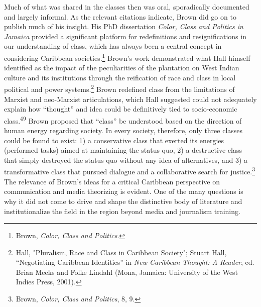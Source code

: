 \documentclass{tufte-handout}
\begin{document}
Much of what was shared in the classes then was oral, sporadically
documented and largely informal. As the relevant citations indicate,
Brown did go on to publish much of his insight. His PhD dissertation
\emph{Color, Class and Politics in} \emph{Jamaica} provided a
significant platform for redefinitions and resignifications in our
understanding of class, which has always been a central concept in
considering Caribbean societies.\footnote{Brown, \emph{Color, Class and
  Politics}.} Brown's work demonstrated what Hall himself identified as
the impact of the peculiarities of the plantation on West Indian culture
and its institutions through the reification of race and class in local
political and power systems.\footnote{Hall, "Pluralism, Race and Class
  in Caribbean Society"; Stuart Hall, ``Negotiating Caribbean
  Identities'' in \emph{New Caribbean Thought: A Reader}, ed. Brian
  Meeks and Folke Lindahl (Mona, Jamaica: University of the West Indies
  Press, 2001).} Brown redefined class from the limitations of Marxist
and neo-Marxist articulations, which Hall suggested could not adequately
explain how ``thought'' and idea could be definitively tied to
socio-economic class.\textsuperscript{49} Brown proposed that ``class'' be understood based on the
direction of human energy regarding society. In every society,
therefore, only three classes could be found to exist: 1) a conservative
class that exerted its energies (performed tasks) aimed at maintaining
the status quo, 2) a destructive class that simply destroyed the status
quo without any idea of alternatives, and 3) a transformative class that
pursued dialogue and a collaborative search for justice.\footnote{Brown,
  \emph{Color, Class and Politics}, 8, 9.} The relevance of Brown's
ideas for a critical Caribbean perspective on communication and media
theorizing is evident. One of the many questions is why it did not come
to drive and shape the distinctive body of literature and
institutionalize the field in the region beyond media and journalism
training.
\end{document}
